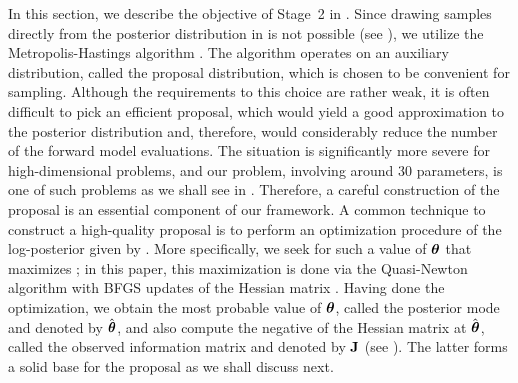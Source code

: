 In this section, we describe the objective of Stage~2 in .
Since drawing samples directly from the posterior distribution in  is not possible (see ), we utilize the Metropolis-Hastings algorithm \cite{gelman2004}.
The algorithm operates on an auxiliary distribution, called the proposal distribution, which is chosen to be convenient for sampling.
Although the requirements to this choice are rather weak, it is often difficult to pick an efficient proposal, which would yield a good approximation to the posterior distribution and, therefore, would considerably reduce the number of the forward model evaluations.
The situation is significantly more severe for high-dimensional problems, and our problem, involving around 30 parameters, is one of such problems as we shall see in .
Therefore, a careful construction of the proposal is an essential component of our framework.
A common technique to construct a high-quality proposal is to perform an optimization procedure of the log-posterior given by .
More specifically, we seek for such a value of ${\boldsymbol\theta}$ that maximizes ; in this paper, this maximization is done via the Quasi-Newton algorithm with BFGS updates of the Hessian matrix \cite{press2007}.
Having done the optimization, we obtain the most probable value of ${\boldsymbol\theta}$, called the posterior mode and denoted by $\hat{{\boldsymbol\theta}}$, and also compute the negative of the Hessian matrix at $\hat{{\boldsymbol\theta}}$, called the observed information matrix and denoted by $\mathbf{J}$ (see ).
The latter forms a solid base for the proposal as we shall discuss next.
